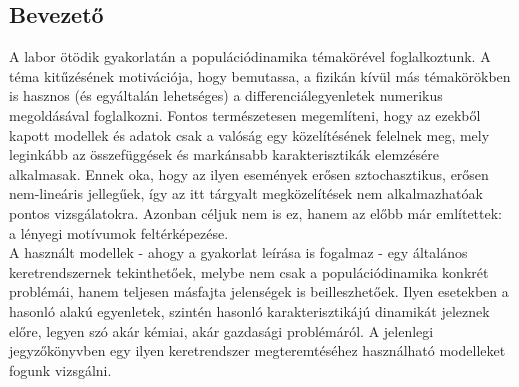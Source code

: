 \begin{multicols}{2}

\section{Bevezető} \label{sec:1}
A labor ötödik gyakorlatán a populációdinamika témakörével foglalkoztunk. A téma kitűzésének motivációja, hogy bemutassa, a fizikán kívül más témakörökben is hasznos (és egyáltalán lehetséges) a differenciálegyenletek numerikus megoldásával foglalkozni. Fontos természetesen megemlíteni, hogy az ezekből kapott modellek és adatok csak a valóság egy közelítésének felelnek meg, mely leginkább az összefüggések és markánsabb karakterisztikák elemzésére alkalmasak. Ennek oka, hogy az ilyen események erősen sztochasztikus, erősen nem-lineáris jellegűek, így az itt tárgyalt megközelítések nem alkalmazhatóak pontos vizsgálatokra. Azonban céljuk nem is ez, hanem az előbb már említettek: a lényegi motívumok feltérképezése. \\
A használt modellek - ahogy a gyakorlat leírása is fogalmaz - egy általános keretrendszernek tekinthetőek, melybe nem csak a populációdinamika konkrét problémái, hanem teljesen másfajta jelenségek is beilleszhetőek. Ilyen esetekben a hasonló alakú egyenletek, szintén hasonló karakterisztikájú dinamikát jeleznek előre, legyen szó akár kémiai, akár gazdasági problémáról\cite{szamszim}. A jelenlegi jegyzőkönyvben egy ilyen keretrendszer megteremtéséhez használható modelleket fogunk vizsgálni.


\end{multicols}
